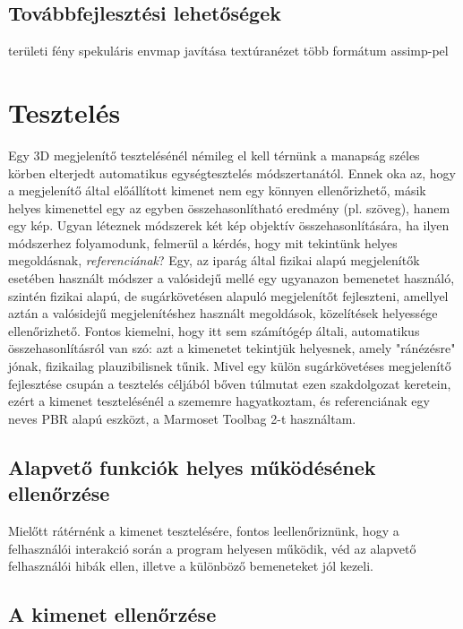 \subsection{Továbbfejlesztési lehetőségek}

területi fény
spekuláris envmap javítása
textúranézet
több formátum assimp-pel

\section{Tesztelés}

Egy 3D megjelenítő tesztelésénél némileg el kell térnünk a manapság széles körben elterjedt automatikus egységtesztelés módszertanától. Ennek oka az, hogy a megjelenítő által előállított kimenet nem egy könnyen ellenőrizhető, másik helyes kimenettel egy az egyben összehasonlítható eredmény (pl. szöveg), hanem egy kép. Ugyan léteznek módszerek két kép objektív összehasonlítására, ha ilyen módszerhez folyamodunk, felmerül a kérdés, hogy mit tekintünk helyes megoldásnak, \textit{referenciának}? Egy, az iparág által fizikai alapú megjelenítők esetében használt módszer a valósidejű mellé egy ugyanazon bemenetet használó, szintén fizikai alapú, de sugárkövetésen alapuló megjelenítőt fejleszteni, amellyel aztán a valósidejű megjelenítéshez használt megoldások, közelítések helyessége ellenőrizhető. Fontos kiemelni, hogy itt sem számítógép általi, automatikus összehasonlításról van szó: azt a kimenetet tekintjük helyesnek, amely "ránézésre" jónak, fizikailag plauzibilisnek tűnik. Mivel egy külön sugárkövetéses megjelenítő fejlesztése csupán a tesztelés céljából bőven túlmutat ezen szakdolgozat keretein, ezért a kimenet tesztelésénél a szememre hagyatkoztam, és referenciának egy neves PBR alapú eszközt, a Marmoset Toolbag 2-t használtam.

\subsection{Alapvető funkciók helyes működésének ellenőrzése}

Mielőtt rátérnénk a kimenet tesztelésére, fontos leellenőriznünk, hogy a felhasználói interakció során a program helyesen működik, véd az alapvető felhasználói hibák ellen, illetve a különböző bemeneteket jól kezeli.

\subsection{A kimenet ellenőrzése}

{}
 